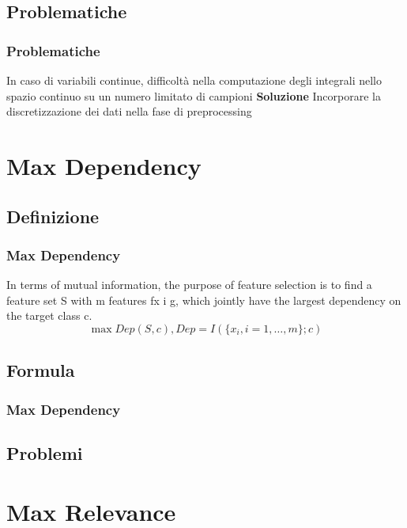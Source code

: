 \documentclass{beamer}
\begin{document}
\subsection{Problematiche}
\begin{frame}
	\frametitle{Problematiche}
	In caso di variabili continue, difficoltà nella computazione degli integrali nello spazio continuo su un numero limitato di campioni\newline\newline
	\textbf{Soluzione}\newline\newline
	Incorporare la discretizzazione dei dati nella fase di preprocessing
\end{frame}


\section{Max Dependency}
\subsection{Definizione}
\begin{frame}
	\frametitle{Max Dependency}
	In terms of mutual information, the purpose of feature selection is to find a feature set S with m features fx i g, which jointly have the largest dependency on the target class c.
	$$ \max Dep(S,c), Dep = I(\{x_i,i=1,\dots,m \};c )$$
\end{frame}


\subsection{Formula}
\begin{frame}
	\frametitle{Max Dependency}

	

\end{frame}
\subsection{Problemi}
\begin{frame}
	
\end{frame}


\section{Max Relevance}
\end{document}
